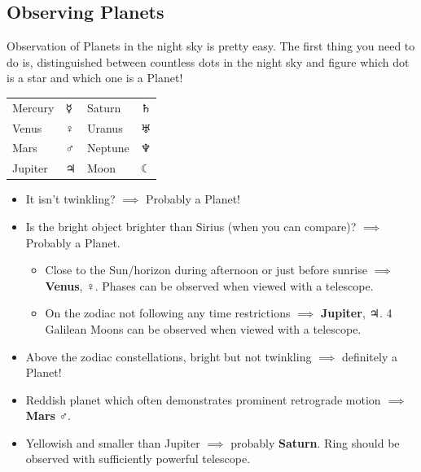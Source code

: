 \documentclass[a4paper,12pt]{extarticle}
\begin{document}
\subsection{Observing Planets}
Observation of Planets in the night sky is pretty easy. The first thing you need to do is, distinguished between countless dots in the night sky and figure which dot is a star and which one is a Planet!
	\begin{table}[H]
	\large
	\centering
	\begingroup
	\setlength{\tabcolsep}{8pt} %
	\renewcommand{\arraystretch}{1.3} %
	\begin{tabular}{|llll|}
		\hline 
		Mercury & $\bm{\Mercury}$ & Saturn  & $\bm{\Saturn}$   \\
		Venus   & $\bm{\Venus}$   & Uranus  & $\bm{\Uranus}$   \\
		Mars    & $\bm{\Mars}$    & Neptune & $\bm{\Neptune}$  \\
		Jupiter & $\bm{\Jupiter}$ & Moon    & $\bm{\leftmoon}$ \\
		\hline
	\end{tabular}
	\endgroup 
\end{table}
\begin{itemize}
	\itemsep0em
	\item It isn't twinkling? $\implies$ Probably a Planet!
	\item Is the bright object brighter than Sirius (when you can compare)? $\implies$ Probably a Planet.
	\begin{itemize}
		\itemsep0em 
		\item Close to the Sun/horizon during afternoon or just before sunrise $\implies$ \textbf{Venus}, $\Venus$. Phases can be observed when viewed with a telescope.
		\item On the zodiac not following any time restrictions $\implies$ \textbf{Jupiter}, $\Jupiter$. 4 Galilean Moons can be observed when viewed with a telescope.
	\end{itemize}
	\item Above the zodiac constellations, bright but not twinkling $\implies$ definitely a Planet!
	\item Reddish planet which often demonstrates prominent retrograde motion $\implies$ \textbf{Mars} $\Mars$.
	\item Yellowish and smaller than Jupiter $\implies$ probably \textbf{Saturn}. Ring should be observed with sufficiently powerful telescope.
\end{itemize}
\end{document}
